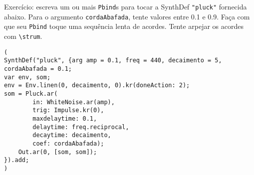 Exercício: escreva um ou mais \texttt{Pbind}s para tocar a SynthDef \texttt{"pluck"} fornecida abaixo. Para o argumento \texttt{cordaAbafada}, tente valores entre  0.1 e 0.9. Faça com que seu \texttt{Pbind} toque uma sequência lenta de acordes. Tente arpejar os acordes com \texttt{\textbackslash strum}.

\begin{lstlisting}[style=SuperCollider-IDE, basicstyle=\scttfamily\footnotesize]
(
SynthDef("pluck", {arg amp = 0.1, freq = 440, decaimento = 5, cordaAbafada = 0.1;
var env, som;
env = Env.linen(0, decaimento, 0).kr(doneAction: 2);
som = Pluck.ar(
        in: WhiteNoise.ar(amp),
        trig: Impulse.kr(0),
        maxdelaytime: 0.1,
        delaytime: freq.reciprocal,
        decaytime: decaimento,
        coef: cordaAbafada);
    Out.ar(0, [som, som]);
}).add;
)
\end{lstlisting}
